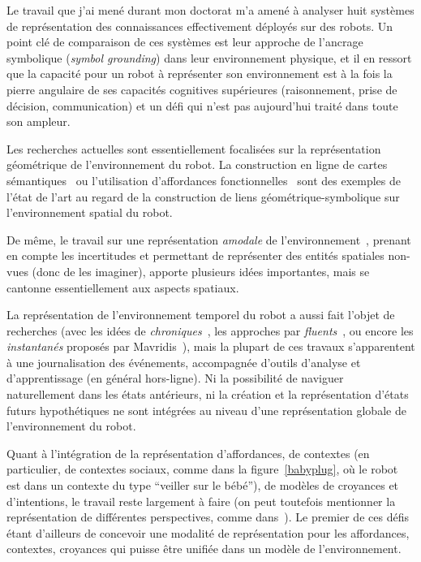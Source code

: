 \documentclass[a4paper]{article}
\begin{document}
Le travail que j'ai mené durant mon doctorat m'a amené à analyser huit systèmes
de représentation des connaissances effectivement déployés sur des robots. Un
point clé de comparaison de ces systèmes est leur approche de l'ancrage
symbolique (\emph{symbol grounding}) dans leur environnement physique, et il en
ressort que la capacité pour un robot à représenter son environnement est à la
fois la pierre angulaire de ses capacités cognitives supérieures (raisonnement,
prise de décision, communication) et un défi qui n'est pas aujourd'hui traité
dans toute son ampleur.

Les recherches actuelles sont essentiellement focalisées sur la représentation
géométrique de l'environnement du robot. La construction en ligne de
cartes sémantiques~\cite{Nuechter2008, Galindo2008,
Blodow2011} ou l'utilisation d'affordances fonctionnelles~\cite{Varadarajan2011}
sont des exemples de l'état de l'art au regard de la construction de liens
géométrique-symbolique sur l'environnement spatial du robot.

De même, le travail sur une représentation \emph{amodale} de
l'environnement~\cite{Mavridis2006}, prenant en compte les incertitudes et
permettant de représenter des entités spatiales non-vues (donc de les imaginer),
apporte plusieurs idées importantes, mais se cantonne essentiellement aux
aspects spatiaux.

La représentation de l'environnement temporel du robot a aussi fait l'objet de
recherches (avec les idées de \emph{chroniques}~\cite{Ghallab1996}, les
approches par \emph{fluents}~\cite{mosenlechner2010becoming}, ou encore les
\emph{instantanés} proposés par Mavridis~\cite{Mavridis2006}), mais la plupart
de ces travaux s'apparentent à une journalisation des événements, accompagnée
d'outils d'analyse et d'apprentissage (en général hors-ligne). Ni la possibilité
de naviguer naturellement dans les états antérieurs, ni la création et la
représentation d'états futurs hypothétiques ne sont intégrées au niveau d'une
représentation globale de l'environnement du robot.

Quant à l'intégration de la représentation d'affordances, de contextes (en
particulier, de contextes sociaux, comme dans la figure~\ref{babyplug}, où le
robot est dans un contexte du type ``veiller sur le bébé''), de modèles de
croyances et d'intentions, le travail reste largement à faire (on peut toutefois
mentionner la représentation de différentes perspectives, comme
dans~\cite{ros2010which}). Le premier de ces défis étant d'ailleurs de concevoir
une modalité de représentation pour les affordances, contextes, croyances qui
puisse être unifiée dans un modèle de l'environnement.
\end{document}
